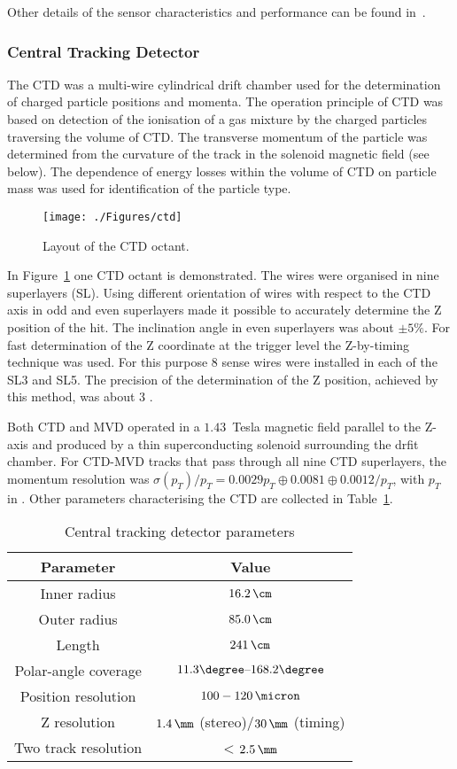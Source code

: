 Other details of the sensor characteristics and performance can be found in~\cite{tech:mvd:prc9701}.

\subsubsection{Central Tracking Detector}
\label{subsubsec:ctd}
The CTD was a multi-wire cylindrical drift chamber used for the determination of charged particle positions and momenta. The operation principle of CTD was based on detection of the ionisation of a gas mixture by the charged particles traversing the volume of CTD. The transverse momentum of the particle was determined from the curvature of the track in the solenoid magnetic field (see below). The dependence of energy losses within the volume of CTD on particle mass was used for identification of the particle type.
\begin{figure}[htpb]
	\centering
		\texttt{[image: ./Figures/ctd]}
	\caption{Layout of the CTD octant.}
	\label{fig:ctd}
\end{figure}
In Figure~\ref{fig:ctd} one CTD octant is demonstrated. The wires were organised in nine superlayers (SL). Using different orientation of wires with respect to the CTD axis in odd and even superlayers made it possible to accurately determine the Z position of the hit. The inclination angle in even superlayers was about $\pm 5\%$. For fast determination of the Z coordinate at the trigger level the Z-by-timing technique was used. For this purpose 8 sense wires were installed in each of the SL3 and SL5. The precision of the determination of the Z position, achieved by this method, was about 3 \cm.

Both CTD and MVD operated in a $1.43$~Tesla magnetic field parallel to the Z-axis and produced by a thin superconducting solenoid surrounding the drfit chamber. For CTD-MVD tracks that pass through all nine CTD superlayers, the momentum resolution was $\sigma(p_{T})/p_{T} = 0.0029 p_{T} \oplus 0.0081 \oplus
0.0012/p_{T}$, with $p_{T}$ in \GeV. Other parameters characterising the CTD are collected in Table~\ref{tab:ctdgeomparameters}.

\begin{table}[htbp]
	\centering
\begin{tabular}{ | c | c | }
     \hline
      Parameter & Value \\
			\hline
			\hline
			Inner radius & $16.2\,\cm$ \\ \hline
      Outer radius & $85.0\,\cm$  \\ \hline
			Length & $241\,\cm$ \\ \hline 
			Polar-angle coverage & $11.3\degree \mbox{--} 168.2\degree$ \\ \hline
			Position resolution & $100-120\,\micron$ \\ \hline
			Z resolution & $1.4\,\mm$ (stereo)/$30\,\mm$ (timing) \\ \hline
			Two track resolution & < $2.5\,\mm$ \\
      \hline
     \end{tabular}
	\caption{Central tracking detector parameters}
	\label{tab:ctdgeomparameters}
\end{table}
